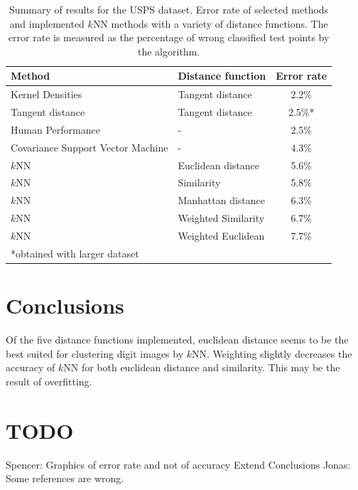 \documentclass[10pt,twocolumn,letterpaper]{article}
\begin{document}
\begin{table}[htdp]
\begin{center}
\begin{tabular}{llc}
\toprule
\bf{Method} & \bf{Distance function} & \bf{Error rate} \\
\midrule
Kernel Densities \cite{keysers} & Tangent distance & 2.2\% \\
Tangent distance \cite{Simard2}& Tangent distance& 2.5\%* \\
Human Performance \cite{Simard} & - & 2.5\%\\
Covariance Support Vector Machine \cite{shivas} & - & 4.3\%\\
$k$NN & Euclidean distance & 5.6\% \\
$k$NN & Similarity  & 5.8\% \\
$k$NN & Manhattan distance & 6.3\% \\
$k$NN & Weighted Similarity  & 6.7\% \\
$k$NN & Weighted Euclidean  & 7.7\% \\
\bottomrule
*obtained with larger dataset
\end{tabular}
\end{center}
\caption{Summary of results for the USPS dataset. Error rate of selected methods and implemented $k$NN methods with a variety of distance functions. The error rate is measured as the percentage of wrong classified test points by the algorithm. }
\label{results}
\end{table}


\section{Conclusions}
Of the five distance functions implemented, euclidean distance seems to be the best suited for clustering digit images by $k$NN. %
Weighting slightly decreases the accuracy of $k$NN for both euclidean distance and similarity. This may be the result of overfitting.

\section{TODO}
Spencer: Graphics of error rate and not of accuracy
Extend Conclusions
Jonas: Some references are wrong.

\nocite{shivas, elkan, bishop}

{\small


}
\end{document}
